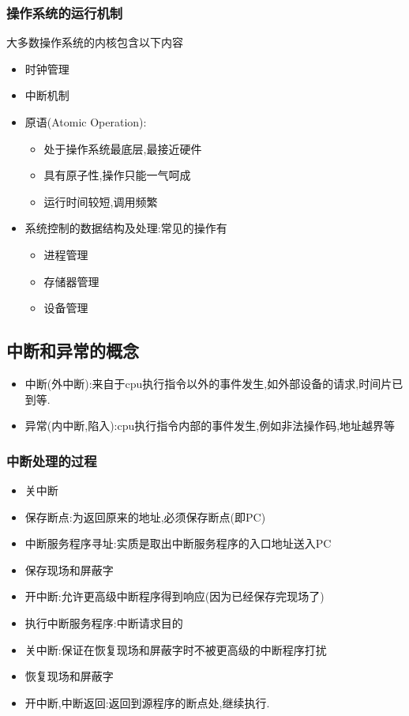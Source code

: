 \documentclass{ctexart}
\begin{document}
\subsubsection{操作系统的运行机制}
大多数操作系统的内核包含以下内容
\begin{itemize}
\item 时钟管理
\item 中断机制
\item 原语(Atomic Operation):
\begin{itemize} 
    \item 处于操作系统最底层,最接近硬件 
    \item 具有原子性,操作只能一气呵成
	\item 运行时间较短,调用频繁 
\end{itemize}
\item 系统控制的数据结构及处理:常见的操作有
\begin{itemize}
    \item 进程管理
    \item 存储器管理
    \item 设备管理
\end{itemize}
\end{itemize}

\subsection{中断和异常的概念}
\begin{itemize}
    \item 中断(外中断):来自于cpu执行指令以外的事件发生,如外部设备的请求,时间片已到等.
    \item 异常(内中断,陷入):cpu执行指令内部的事件发生,例如非法操作码,地址越界等
\end{itemize}
\subsubsection{中断处理的过程}
\begin{itemize}
    \item 关中断
    \item 保存断点:为返回原来的地址,必须保存断点(即PC)
    \item 中断服务程序寻址:实质是取出中断服务程序的入口地址送入PC
    \item 保存现场和屏蔽字
    \item 开中断:允许更高级中断程序得到响应(因为已经保存完现场了)
    \item 执行中断服务程序:中断请求目的
    \item 关中断:保证在恢复现场和屏蔽字时不被更高级的中断程序打扰
    \item 恢复现场和屏蔽字
    \item 开中断,中断返回:返回到源程序的断点处,继续执行.
\end{itemize}
\end{document}
